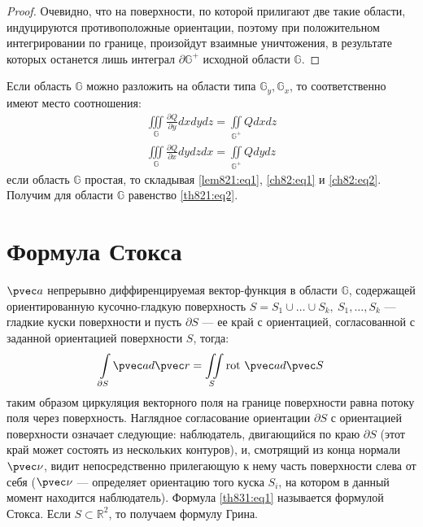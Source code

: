 \begin{proof}
  Очевидно, что на поверхности, по которой прилигают две такие области,
  индуцируются противоположные ориентации, поэтому при положительном
  интегрировании по границе, произойдут взаимные уничтожения, в результате
  которых останется лишь интеграл $\partial \mathbb{G}^+$ исходной области
  $\mathbb{G}$.
\end{proof}

Если область $\mathbb{G}$ можно разложить на области типа $\mathbb{G}_y,
\mathbb{G}_x$, то соответственно имеют место соотношения:
\begin{gather}
  \iiint\limits_{\mathbb{G}} \frac{\partial Q}{\partial y} dx dy dz =
  \iint\limits_{\mathbb{G}^+} Q dx dz
  \label{ch82:eq1} \\
  \iiint\limits_{\mathbb{G}} \frac{\partial Q}{\partial x} dy dz dx =
  \iint\limits_{\mathbb{G}^+} Q dy dz
  \label{ch82:eq2}
\end{gather}
если область $\mathbb{G}$ простая, то складывая \eqref{lem821:eq1},
\eqref{ch82:eq1} и \eqref{ch82:eq2}. Получим для области $\mathbb{G}$ равенство
\eqref{th821:eq2}.

\section{Формула Стокса}
\begin{theorem}
  $\pvec a$ непрерывно диффиренцируемая вектор-функция в области $\mathbb{G}$,
  содержащей ориентированную кусочно-гладкую поверхность $S = S_1 \cup \dots
  \cup S_k, \ S_1, \dots, S_k$ --- гладкие куски поверхности и пусть $\partial
  S$ --- ее край с ориентацией, согласованной с заданной ориентацией
  поверхности $S$, тогда:
  \begin{gather}
    \int\limits_{\partial S} \pvec a d \pvec r = \iint\limits_S \mbox{rot} \
    \pvec a d \pvec S
    \label{th831:eq1}
  \end{gather}
  таким образом циркуляция векторного поля на границе поверхности равна потоку
  поля через поверхность. Наглядное согласование ориентации $\partial S$ с
  ориентацией поверхности означает следующие: наблюдатель, двигающийся по краю
  $\partial S$ (этот край может состоять из нескольких контуров), и, смотрящий
  из конца нормали $\pvec \nu$, видит непосредственно прилегающую к нему часть
  поверхности слева от себя ($\pvec \nu$ --- определяет ориентацию того куска
  $S_i$, на котором в данный момент находится наблюдатель). Формула
  \eqref{th831:eq1} называется формулой Стокса. Если $S \subset \mathbb{R}^2$,
  то получаем формулу Грина.
\end{theorem}


